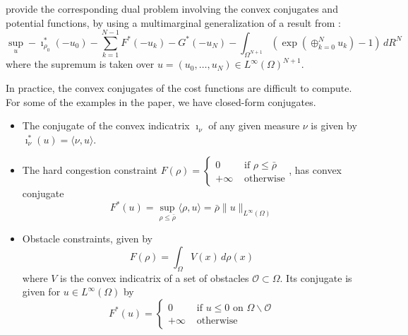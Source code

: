 \documentclass{article}
\begin{document}
    \textcite{benamou2018entropy} provide the corresponding dual problem involving the convex conjugates and potential functions, by using a multimarginal generalization of a result from \textcite{chizat2016scaling}:
    \begin{equation}\label{eq:TimeDiscreteDual}
    	\sup_u -\imath_{\rho_0}^*(-u_0) - \sum_{k=1}^{N-1} F^*(-u_k) - G^*(-u_N)
    	- \int_{\Omega^{N+1}} \left(\exp\left(\oplus_{k=0}^N u_k\right)-1\right) \,dR^N
    \end{equation}
    where the supremum is taken over $u = (u_0,\ldots,u_N) \in L^\infty(\Omega)^{N+1}$.
    
	\begin{remark}\label{rem:ConvexConj}
	In practice, the convex conjugates of the cost functions are difficult to compute. For some of the examples in the paper, we have closed-form conjugates.
	\begin{itemize}
		\item The conjugate of the convex indicatrix $\imath_{\nu}$ of any given measure $\nu$ is given by $\imath_{\nu}^*(u) = \langle \nu, u\rangle$.
		\item The hard congestion constraint $F(\rho) = \begin{cases}
		0&\text{ if }\rho\leq \bar{\rho} \\
		+\infty&\text{ otherwise}
		\end{cases}$, has convex conjugate
		\[
			F^*(u) = \sup_{\rho\leq \bar{\rho}}{} \langle \rho, u\rangle = \bar{\rho}\|u\|_{L^\infty(\Omega)}
		\]
		\item Obstacle constraints, given by
		\[
		F(\rho) = \int_\Omega V(x)\,d\rho(x) 
		\]
		where $V$ is the convex indicatrix of a set of obstacles $\mathscr{O} \subset \Omega$. Its conjugate is given for $u\in L^\infty(\Omega)$ by
		\[
		F^*(u) = \begin{cases}
		0& \text{ if } u \leq 0\text{ on }\Omega\backslash\mathscr{O} \\
		+\infty& \text{ otherwise}
		\end{cases}
		\]
	\end{itemize}
	\end{remark}
    
\end{document}
